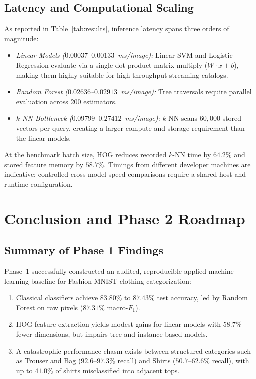 \documentclass[conference]{IEEEtran}
\begin{document}
\subsection{Latency and Computational Scaling}
As reported in Table~\ref{tab:results}, inference latency spans three
orders of magnitude:
\begin{itemize}
  \item \emph{Linear Models ($0.00037$--$0.00133$~ms/image):} Linear SVM
    and Logistic Regression evaluate via a single dot-product matrix
    multiply ($W \cdot x + b$), making them highly suitable for
    high-throughput streaming catalogs.
  \item \emph{Random Forest ($0.02636$--$0.02913$~ms/image):} Tree
    traversals require parallel evaluation across 200 estimators.
  \item \emph{$k$-NN Bottleneck ($0.09799$--$0.27412$~ms/image):} $k$-NN
    scans $60{,}000$ stored vectors per query, creating a larger compute
    and storage requirement than the linear models.
\end{itemize}
At the benchmark batch size, HOG reduces recorded $k$-NN time by $64.2\%$
and stored feature memory by $58.7\%$. Timings from different developer
machines are indicative; controlled cross-model speed comparisons require
a shared host and runtime configuration.

\section{Conclusion and Phase 2 Roadmap}
\label{sec:conclusion}

\subsection{Summary of Phase 1 Findings}
Phase~1 successfully constructed an audited, reproducible applied machine
learning baseline for Fashion-MNIST clothing categorization:
\begin{enumerate}
  \item Classical classifiers achieve $83.80\%$ to $87.43\%$ test accuracy,
    led by Random Forest on raw pixels ($87.31\%$ macro-$F_1$).
  \item HOG feature extraction yields modest gains for linear models with
    $58.7\%$ fewer dimensions, but impairs tree and instance-based models.
  \item A catastrophic performance chasm exists between structured
    categories such as Trouser and Bag ($92.6$--$97.3\%$ recall) and
    Shirts ($50.7$--$62.6\%$ recall), with
    up to $41.0\%$ of shirts misclassified into adjacent tops.
\end{enumerate}
\end{document}
